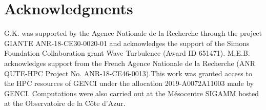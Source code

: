 \documentclass[sn-mathphys]{sn-jnl}%
\begin{document}
\section{Acknowledgments}
    G.K. was supported by the Agence Nationale de la Recherche through the project GIANTE ANR-18-CE30-0020-01 and acknowledges the support of the Simons Foundation Collaboration grant Wave Turbulence (Award ID 651471). M.E.B. acknowledges support from the French Agence Nationale de la Recherche (ANR QUTE-HPC Project No. ANR-18-CE46-0013).This work was granted access to the HPC resources of GENCI under the allocation 2019-A0072A11003 made by GENCI.
    Computations were also carried out at the Mésocentre SIGAMM hosted at the Observatoire de la Côte d'Azur.



%

\end{document}

